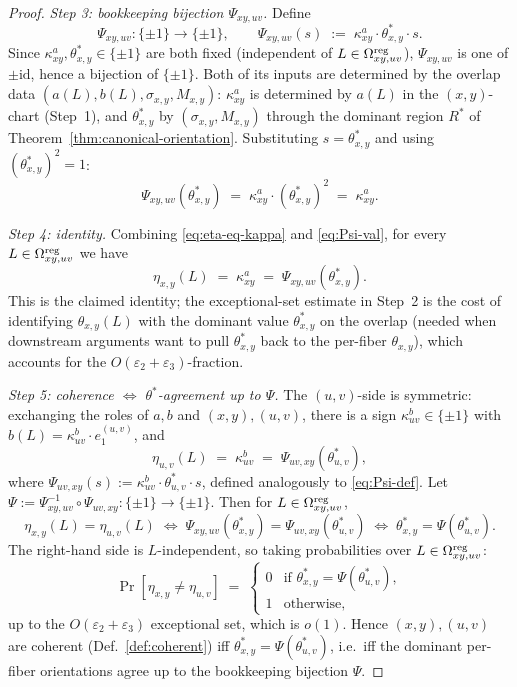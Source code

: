 \begin{proof}
\smallskip
\emph{Step 3: bookkeeping bijection $\Psi_{xy,uv}$.}
Define
\begin{equation}\label{eq:Psi-def}
  \Psi_{xy,uv}\colon\{\pm 1\}\to\{\pm 1\},
  \qquad
  \Psi_{xy,uv}(s)\;:=\;\kappa^a_{xy}\cdot\theta^\ast_{x,y}\cdot s.
\end{equation}
Since $\kappa^a_{xy},\theta^\ast_{x,y}\in\{\pm 1\}$ are both fixed
(independent of $L\in\Omega^{\mathrm{reg}}_{xy,uv}$), $\Psi_{xy,uv}$ is one of
$\pm\mathrm{id}$, hence a bijection of $\{\pm 1\}$. Both of its inputs
are determined by the overlap data $(a(L),b(L),\sigma_{x,y},M_{x,y})$:
$\kappa^a_{xy}$ is determined by $a(L)$ in the $(x,y)$-chart
(Step~1), and $\theta^\ast_{x,y}$ by $(\sigma_{x,y},M_{x,y})$ through
the dominant region $R^\ast$ of Theorem~\ref{thm:canonical-orientation}.
Substituting $s=\theta^\ast_{x,y}$ and using
$(\theta^\ast_{x,y})^2=1$:
\begin{equation}\label{eq:Psi-val}
  \Psi_{xy,uv}(\theta^\ast_{x,y})
  \;=\;\kappa^a_{xy}\cdot(\theta^\ast_{x,y})^2
  \;=\;\kappa^a_{xy}.
\end{equation}

\smallskip
\emph{Step 4: identity.}
Combining \eqref{eq:eta-eq-kappa} and \eqref{eq:Psi-val}, for every
$L\in\Omega^{\mathrm{reg}}_{xy,uv}$ we have
\[
  \eta_{x,y}(L)\;=\;\kappa^a_{xy}\;=\;\Psi_{xy,uv}(\theta^\ast_{x,y}).
\]
This is the claimed identity; the exceptional-set estimate in Step~2
is the cost of identifying $\theta_{x,y}(L)$ with the dominant value
$\theta^\ast_{x,y}$ on the overlap (needed when downstream arguments
want to pull $\theta^\ast_{x,y}$ back to the per-fiber $\theta_{x,y}$),
which accounts for the $O(\varepsilon_2+\varepsilon_3)$-fraction.

\smallskip
\emph{Step 5: coherence $\iff$ $\theta^\ast$-agreement up to $\Psi$.}
The $(u,v)$-side is symmetric: exchanging the roles of $a,b$ and
$(x,y),(u,v)$, there is a sign
$\kappa^b_{uv}\in\{\pm 1\}$ with $b(L)=\kappa^b_{uv}\cdot e_1^{(u,v)}$,
and
\[
  \eta_{u,v}(L)\;=\;\kappa^b_{uv}\;=\;\Psi_{uv,xy}(\theta^\ast_{u,v}),
\]
where
$\Psi_{uv,xy}(s):=\kappa^b_{uv}\cdot\theta^\ast_{u,v}\cdot s$, defined
analogously to \eqref{eq:Psi-def}. Let
$\Psi:=\Psi_{xy,uv}^{-1}\circ\Psi_{uv,xy}\colon\{\pm 1\}\to\{\pm 1\}$.
Then for $L\in\Omega^{\mathrm{reg}}_{xy,uv}$,
\[
  \eta_{x,y}(L)=\eta_{u,v}(L)
  \;\iff\;
  \Psi_{xy,uv}(\theta^\ast_{x,y})=\Psi_{uv,xy}(\theta^\ast_{u,v})
  \;\iff\;
  \theta^\ast_{x,y}=\Psi(\theta^\ast_{u,v}).
\]
The right-hand side is $L$-independent, so taking probabilities over
$L\in\Omega^{\mathrm{reg}}_{xy,uv}$:
\[
  \Pr[\eta_{x,y}\ne\eta_{u,v}]\;=\;
  \begin{cases}
    0 & \text{if }\theta^\ast_{x,y}=\Psi(\theta^\ast_{u,v}),\\
    1 & \text{otherwise,}
  \end{cases}
\]
up to the $O(\varepsilon_2+\varepsilon_3)$ exceptional set, which is
$o(1)$. Hence $(x,y),(u,v)$ are coherent
(Def.~\ref{def:coherent}) iff
$\theta^\ast_{x,y}=\Psi(\theta^\ast_{u,v})$, i.e.\ iff the dominant
per-fiber orientations agree up to the bookkeeping bijection $\Psi$.
\end{proof}

